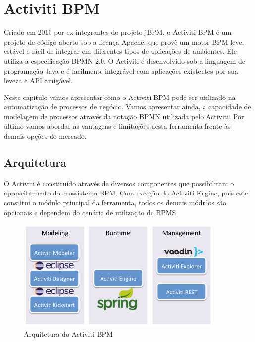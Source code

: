 \chapter{Activiti BPM}\label{chp:activiti-bpm}

Criado em 2010 por ex-integrantes do projeto jBPM, o Activiti BPM é um projeto de código aberto sob a licença Apache, que provê um motor BPM leve, estável e fácil de integrar em diferentes tipos de aplicações de ambientes. Ele utiliza a especificação BPMN 2.0. O Activiti é desenvolvido sob a linguagem de programação Java e é facilmente integrável com aplicações existentes por sua leveza e API amigável.%

Neste capítulo vamos apresentar como o Activiti BPM pode ser utilizado na automatização de processos de negócio. Vamos apresentar ainda, a capacidade de modelagem de processos através da notação BPMN utilizada pelo Activiti. Por último vamos abordar as vantagens e limitações desta ferramenta frente às demais opções do mercado.

\section{Arquitetura}\label{sec:automatizacao_processos-gestao_processos}


O Activiti é constituído através de diversos componentes que possibilitam o aproveitamento do ecossistema BPM. Com exceção do Activiti Engine, pois este constitui o módulo principal da ferramenta, todos os demais módulos são opcionais e dependem do cenário de utilização do BPMS.

\begin{figure}[H]
\centering
\includegraphics[width=0.9\textwidth]{imagens/activiti_architecture.png}
\caption{Arquitetura do Activiti BPM}
\label{fig:activiti_architecture}
\end{figure}

